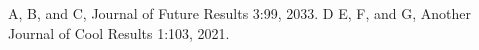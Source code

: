 \documentclass[
    papertype=a4paper,
]{phfextendedabstract}
\begin{document}
\begin{thebibliography}{9}
  A, B, and C, Journal of Future Results 3:99, 2033.
  D E, F, and G, Another Journal of Cool Results 1:103, 2021.
\end{thebibliography}
\end{document}

